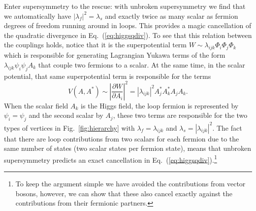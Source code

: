 \documentclass[notes.tex]{subfiles}
\begin{document}
Enter supersymmetry to the rescue: with unbroken supersymmetry we find that we automatically have $|\lambda_f|^2 = \lambda_s$ and exactly twice as many scalar as fermion degrees of freedom running around in loops. This provides a magic cancellation of the quadratic divergence in Eq.~(\ref{eq:higgsqdiv}). To see that this relation between the couplings holds, notice that it is the superpotential term $W \sim \lambda_{ijk}\Phi_i\Phi_j \Phi_k$ which is responsible for generating Lagrangian Yukawa terms of the form $\lambda_{ijk} \psi_i\psi_j A_k$ that couple two fermions to a scalar.
 At the same time, in the scalar potential, that same superpotential term is responsible for the terms
\begin{equation}
V(A,A^*) \sim \left|\frac{\partial W}{\partial A_i}\right|^2 = |\lambda_{ijk}|^2A^*_jA^*_kA_jA_k.
\end{equation}
When the scalar field $A_k$ is the Higgs field, the loop fermion is represented by $\psi_i=\psi_j$ and the second scalar by $A_j$, these two terms are responsible for the two types of vertices in Fig.~\ref{fig:hierarchy} with $\lambda_f=\lambda_{ijk}$ and $\lambda_s=|\lambda_{ijk}|^2$. The fact that there are loop contributions from two scalars for each fermion due to the same number of states (two scalar states per fermion state), means that unbroken supersymmetry predicts an exact cancellation in Eq.~(\ref{eq:higgsqdiv}).\footnote{To keep the argument simple we have avoided the contributions from vector bosons, however, we can show that these also cancel exactly against the contributions from their fermionic partners.}
\end{document}
